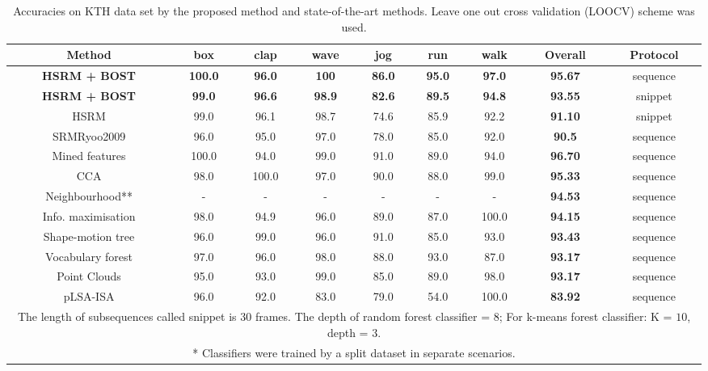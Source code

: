 \begin{sidewaystable}
\centering
\begin{tabular}{|c|c|c|c|c|c|c|c|c|}
\hline
\textbf{Method} & \textbf{box} & \textbf{clap} & \textbf{wave} & \textbf{jog} & \textbf{run} & \textbf{walk} & \textbf{Overall} & \textbf{Protocol} \\
\hline
\textbf{ \color{blue} HSRM + BOST} & \textbf{ \color{blue} 100.0} & \textbf{ \color{blue}96.0} & \textbf{ \color{blue}100} & \textbf{ \color{blue}86.0} & \textbf{ \color{blue}95.0} & \textbf{ \color{blue}97.0} & \textbf{ \color{blue}95.67} & sequence\\
\textbf{ \color{blue} HSRM + BOST} & \textbf{ \color{blue} 99.0} & \textbf{ \color{blue} 96.6} & \textbf{ \color{blue}98.9} & \textbf{ \color{blue}82.6} & \textbf{ \color{blue}89.5} & \textbf{ \color{blue}94.8} & \textbf{ \color{blue} 93.55} & snippet\\
HSRM & 99.0 & 96.1 & 98.7 & 74.6 & 85.9 & 92.2 & \textbf{ 91.10} & snippet\\
SRM{Ryoo2009} & 96.0 & 95.0 & 97.0 & 78.0 & 85.0 & 92.0 & \textbf{ 90.5} & sequence\\
\hline
Mined features \cite{Gilbert2009} & 100.0 & 94.0 & 99.0 & 91.0 & 89.0 & 94.0 & \textbf{ 96.70} & sequence\\
CCA \cite{Kim2007} & 98.0 & 100.0 & 97.0 & 90.0 & 88.0 & 99.0 & \textbf{ 95.33} & sequence\\
Neighbourhood** \cite{Kovashka2010} & - & - & - & - & - & - & \textbf{ 94.53} & sequence\\
Info. maximisation \cite{Liu2008} & 98.0 & 94.9 & 96.0 & 89.0 & 87.0 & 100.0 & \textbf{ 94.15} & sequence\\
Shape-motion tree \cite{Lin2009} & 96.0 & 99.0 & 96.0 & 91.0 & 85.0 & 93.0 & \textbf{ 93.43} & sequence\\
Vocabulary forest \cite{Mikolajczyk2008} & 97.0 & 96.0 & 98.0 & 88.0 & 93.0 & 87.0 & \textbf{ 93.17} & sequence\\
Point Clouds \cite{Bregonzio2009} & 95.0 & 93.0 & 99.0 & 85.0 & 89.0 & 98.0 & \textbf{ 93.17} & sequence\\
pLSA-ISA \cite{Wong2007} & 96.0 & 92.0 & 83.0 & 79.0 & 54.0 & 100.0 & \textbf{ 83.92} & sequence\\
\hline
\multicolumn{9}{p{0.9\linewidth}}{
\scriptsize * The length of subsequences called snippet is 30 frames. The depth of random forest classifier = $8$; For k-means forest classifier: K = $10$, depth = $3$. 
}\\
\multicolumn{9}{p{0.9\linewidth}}{
\scriptsize ** Classifiers were trained by a split dataset in separate scenarios. 
}\\
\end{tabular}
\caption{Accuracies on KTH data set by the proposed method and state-of-the-art methods. Leave one out cross validation (LOOCV) scheme was used.}
\label{tab/act/compare}
\end{sidewaystable}
